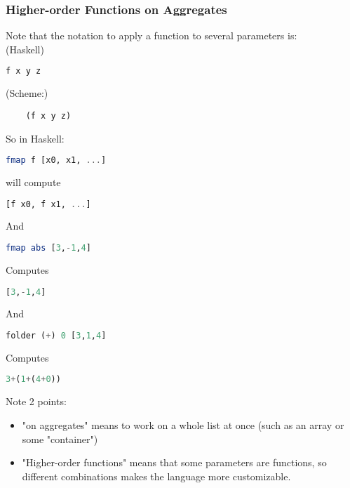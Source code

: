 \documentclass[12pt]{article}
\begin{document}
\subsubsection{Higher-order Functions on Aggregates}

Note that the notation to apply a function to several parameters is:
\\(Haskell)
\begin{lstlisting}[language=Haskell]
    f x y z
\end{lstlisting}
(Scheme:)
\begin{lstlisting}
    (f x y z)
\end{lstlisting}

So in Haskell:
\begin{lstlisting}[language=Haskell]
    fmap f [x0, x1, ...]
\end{lstlisting}

will compute

\begin{lstlisting}[language=Haskell]
    [f x0, f x1, ...]
\end{lstlisting}

And

\begin{lstlisting}[language=Haskell]
    fmap abs [3,-1,4]
\end{lstlisting}

Computes

\begin{lstlisting}[language=Haskell]
    [3,-1,4]
\end{lstlisting}

And 

\begin{lstlisting}[language=Haskell]
    folder (+) 0 [3,1,4]
\end{lstlisting}

Computes

\begin{lstlisting}[language=Haskell]
    3+(1+(4+0))
\end{lstlisting}

Note 2 points:
\begin{itemize}
    \item "on aggregates" means to work on a whole list at once (such as an array or some "container")
    \item "Higher-order functions" means that some parameters are functions, so different combinations makes the language more customizable.
\end{itemize}
\end{document}

